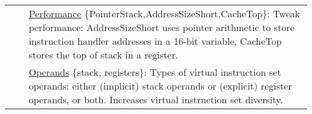 \begin{table*}[p]
\begin{tabular}{|p{2.25cm}|p{4cm}|p{11cm}|}
                                     &                                                                                                                                                                                                                                                                                                         & \underline{Performance} \{PointerStack,AddressSizeShort,CacheTop\}: Tweak performance:  AddressSizeShort uses pointer arithmetic to store instruction handler addresses in a 16-bit variable, CacheTop stores the top of stack in a register.                                                                  \\ \cline{3-3} 
                                     &                                                                                                                                                                                                                                                                                                         & \underline{Operands} \{stack, registers\}: Types of virtual instruction set operands: either (implicit) stack operands or (explicit) register operands, or both. Increases virtual instruction set diversity.                                                                                                                                                                                               \\ \hline
\end{tabular}
\end{table*}
